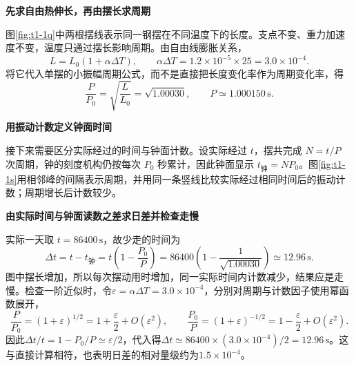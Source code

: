 \begin{solution}\textbf{先求自由热伸长，再由摆长求周期}\par\nobreak
图\ref{fig:t1-1q}中两根摆线表示同一钢摆在不同温度下的长度。支点不变、重力加速度不变，温度只通过摆长影响周期。由自由线膨胀关系，
\[L=L_0(1+\alpha\Delta T),\qquad \alpha\Delta T=1.2\times10^{-5}\times25=3.0\times10^{-4}.\]
将它代入单摆的小振幅周期公式，而不是直接把长度变化率作为周期变化率，得
\[\frac P{P_0}=\sqrt{\frac L{L_0}}=\sqrt{1.00030},\qquad \boxed{P\simeq1.000150\,\mathrm s}.\]


\par\medskip{}\noindent\textbf{用振动计数定义钟面时间}\par\nobreak
接下来需要区分实际经过的时间与钟面计数。设实际经过 $t$，摆共完成 $N=t/P$ 次周期，钟的刻度机构仍按每次 $P_0$ 秒累计，因此钟面显示 $t_{\text{钟}}=NP_0$。图\ref{fig:t1-1s}用相邻峰的间隔表示周期，并用同一条竖线比较实际经过相同时间后的振动计数；周期增长后计数较少。



\par\medskip{}\noindent\textbf{由实际时间与钟面读数之差求日差并检查走慢}\par\nobreak
实际一天取 $t=86400\,\mathrm s$，故少走的时间为
\[\Delta t=t-t_{\text{钟}}=t\left(1-\frac{P_0}{P}\right)
=86400\left(1-\frac1{\sqrt{1.00030}}\right)
\simeq\boxed{12.96\,\mathrm s}.\]
图中摆长增加，所以每次摆动用时增加，同一实际时间内计数减少，结果应是走慢。检查一阶近似时，令$\varepsilon=\alpha\Delta T=3.0\times10^{-4}$，分别对周期与计数因子使用幂函数展开，
\[
\frac P{P_0}=(1+\varepsilon)^{1/2}
=1+\frac{\varepsilon}{2}+O(\varepsilon^2),\qquad
\frac{P_0}{P}=(1+\varepsilon)^{-1/2}
=1-\frac{\varepsilon}{2}+O(\varepsilon^2).
\]
因此$\Delta t/t=1-P_0/P\simeq\varepsilon/2$，代入得$\Delta t\simeq86400\times(3.0\times10^{-4})/2=12.96\,\mathrm s$。这与直接计算相符，也表明日差的相对量级约为$1.5\times10^{-4}$。
\end{solution}
